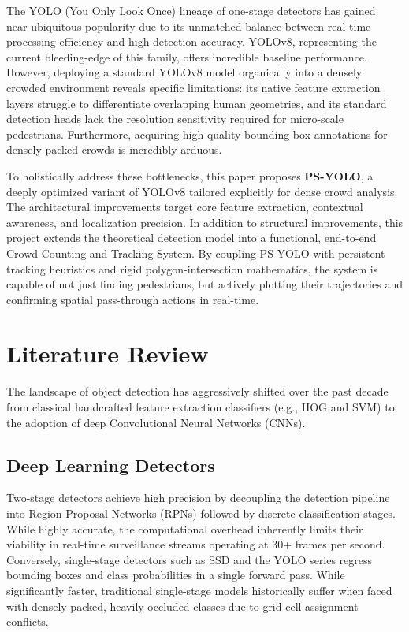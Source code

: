 \documentclass[11pt,a4paper]{article}
\begin{document}
The YOLO (You Only Look Once) lineage of one-stage detectors has gained near-ubiquitous popularity due to its unmatched balance between real-time processing efficiency and high detection accuracy. YOLOv8, representing the current bleeding-edge of this family, offers incredible baseline performance. However, deploying a standard YOLOv8 model organically into a densely crowded environment reveals specific limitations: its native feature extraction layers struggle to differentiate overlapping human geometries, and its standard detection heads lack the resolution sensitivity required for micro-scale pedestrians. Furthermore, acquiring high-quality bounding box annotations for densely packed crowds is incredibly arduous.

To holistically address these bottlenecks, this paper proposes \textbf{PS-YOLO}, a deeply optimized variant of YOLOv8 tailored explicitly for dense crowd analysis. The architectural improvements target core feature extraction, contextual awareness, and localization precision. In addition to structural improvements, this project extends the theoretical detection model into a functional, end-to-end Crowd Counting and Tracking System. By coupling PS-YOLO with persistent tracking heuristics and rigid polygon-intersection mathematics, the system is capable of not just finding pedestrians, but actively plotting their trajectories and confirming spatial pass-through actions in real-time.

\section{Literature Review}
The landscape of object detection has aggressively shifted over the past decade from classical handcrafted feature extraction classifiers (e.g., HOG and SVM) to the adoption of deep Convolutional Neural Networks (CNNs). 

\subsection{Deep Learning Detectors}
Two-stage detectors achieve high precision by decoupling the detection pipeline into Region Proposal Networks (RPNs) followed by discrete classification stages. While highly accurate, the computational overhead inherently limits their viability in real-time surveillance streams operating at 30+ frames per second. Conversely, single-stage detectors such as SSD and the YOLO series regress bounding boxes and class probabilities in a single forward pass. While significantly faster, traditional single-stage models historically suffer when faced with densely packed, heavily occluded classes due to grid-cell assignment conflicts.
\end{document}
